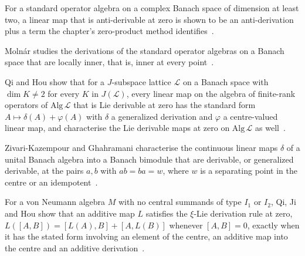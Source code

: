 For a standard operator algebra on a complex Banach space of dimension at least two, a linear map that is anti-derivable at zero is shown to be an anti-derivation plus a term the chapter's zero-product method identifies~\cite{WlAntiDerivableLinearMapsAtZeroO2019}.

Moln\'ar studies the derivations of the standard operator algebras on a Banach space that are locally inner, that is, inner at every point~\cite{WlLocallyInnerDerivationsOfStand1996}.

Qi and Hou show that for a $J$-subspace lattice $\mathcal{L}$ on a Banach space with $\dim K\neq 2$ for every $K$ in $J(\mathcal{L})$, every linear map on the algebra of finite-rank operators of $\mathrm{Alg}\,\mathcal{L}$ that is Lie derivable at zero has the standard form $A\mapsto\delta(A)+\varphi(A)$ with $\delta$ a generalized derivation and $\varphi$ a centre-valued linear map, and characterise the Lie derivable maps at zero on $\mathrm{Alg}\,\mathcal{L}$ as well~\cite{WlLinearMapsLieDerivableAtZeroOn2010}.

Zivari-Kazempour and Ghahramani characterise the continuous linear maps $\delta$ of a unital Banach algebra into a Banach bimodule that are derivable, or generalized derivable, at the pairs $a,b$ with $ab=ba=w$, where $w$ is a separating point in the centre or an idempotent~\cite{WlDerivableMapsAtCommutativeProd2024}.

For a von Neumann algebra $M$ with no central summands of type $I_1$ or $I_2$, Qi, Ji and Hou show that an additive map $L$ satisfies the $\xi$-Lie derivation rule at zero, $L([A,B])=[L(A),B]+[A,L(B)]$ whenever $[A,B]=0$, exactly when it has the stated form involving an element of the centre, an additive map into the centre and an additive derivation~\cite{WlCharacterizationOfAdditiveMaps2015}.
